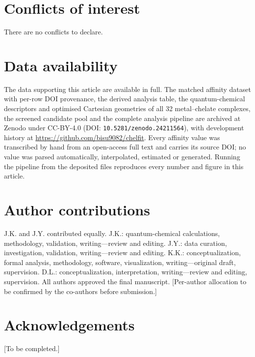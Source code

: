 \section*{Conflicts of interest}
There are no conflicts to declare.

\section*{Data availability}
The data supporting this article are available in full. The matched affinity dataset with per-row DOI provenance, the derived analysis table, the quantum-chemical descriptors and optimised Cartesian geometries of all 32 metal--chelate complexes, the screened candidate pool and the complete analysis pipeline are archived at Zenodo under CC-BY-4.0 (DOI: \texttt{10.5281/zenodo.24211564}), with development history at \url{https://github.com/bisu9082/chelfit}. Every affinity value was transcribed by hand from an open-access full text and carries its source DOI; no value was parsed automatically, interpolated, estimated or generated. Running the pipeline from the deposited files reproduces every number and figure in this article.

\section*{Author contributions}
J.K. and J.Y. contributed equally. J.K.: quantum-chemical calculations, methodology, validation, writing---review and editing. J.Y.: data curation, investigation, validation, writing---review and editing. K.K.: conceptualization, formal analysis, methodology, software, visualization, writing---original draft, supervision. D.L.: conceptualization, interpretation, writing---review and editing, supervision. All authors approved the final manuscript. [Per-author allocation to be confirmed by the co-authors before submission.]

\section*{Acknowledgements}
[To be completed.]

\balance
\renewcommand\refname{Notes and references}




